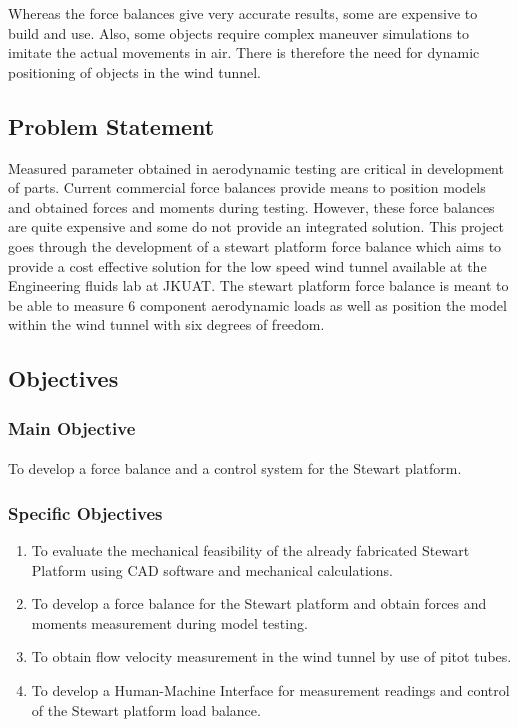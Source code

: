 Whereas the force balances give very accurate results, some are expensive to build and use. Also, some objects require complex maneuver simulations to imitate the actual movements in air. There is therefore the need for dynamic positioning of objects in the wind tunnel.
\subsection{Problem Statement}
Measured parameter obtained in aerodynamic testing are critical in development of parts. Current commercial force balances provide means to position models and obtained forces and moments during testing. 
However, these force balances are quite expensive and some do not provide an integrated solution. This project goes through the development of a stewart platform force balance which aims to provide a cost effective solution for the low speed wind tunnel available at the Engineering fluids lab at JKUAT. 
The stewart platform force balance is meant to be able to measure 6 component aerodynamic loads as well as position the model within the wind tunnel with six degrees of freedom.
\subsection{Objectives}
\subsubsection{Main Objective}
\paragraph{} To develop a force balance and a control system for the Stewart platform. 
\subsubsection{Specific Objectives}
\begin{enumerate}
\item To evaluate the mechanical feasibility of the already fabricated Stewart Platform using CAD software and mechanical calculations.
\item To develop a force balance for the Stewart platform and obtain forces and moments measurement during model testing.
\item To obtain flow velocity measurement in the wind tunnel by use of pitot tubes.
\item To develop a Human-Machine Interface for measurement readings and control of the Stewart platform load balance.
\end{enumerate}
